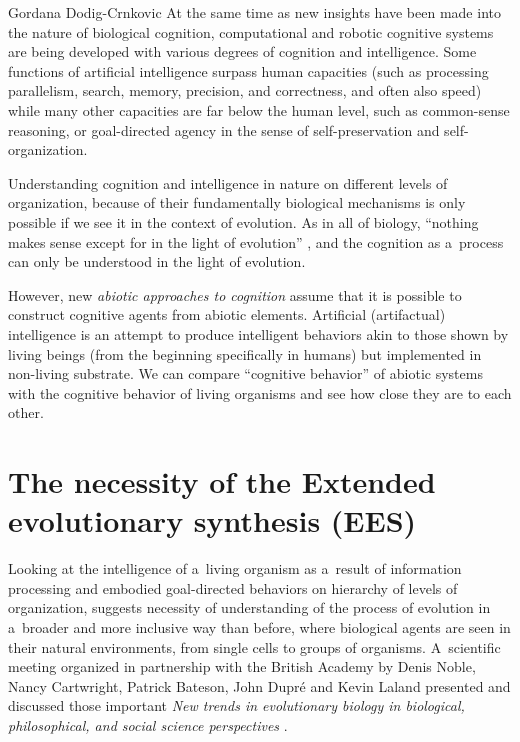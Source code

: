 \begin{artengenv}{Gordana Dodig-Crnkovic}
At the same time as new insights have been made into the nature of biological cognition, computational and robotic cognitive systems are being developed with various degrees of cognition and intelligence. Some functions of artificial intelligence surpass human capacities (such as processing parallelism, search, memory, precision, and correctness, and often also speed) while many other capacities are far below the human level, such as common-sense reasoning, or goal-directed agency in the sense of self-preservation and self-organization.

Understanding cognition and intelligence in nature on different levels of organization, because of their fundamentally biological mechanisms is only possible if we see it in the context of evolution. As in all of biology, ``nothing makes sense except for in the light of evolution''
\parencite[][]{dobzhansky_nothing_1973}, %
 and the cognition as a~process can only be understood in the light of evolution.

However, new \textit{abiotic approaches to cognition} assume that it is possible to construct cognitive agents from abiotic elements. Artificial (artifactual) intelligence is an attempt to produce intelligent behaviors akin to those shown by living beings (from the beginning specifically in humans) but implemented in non-living substrate. We can compare ``cognitive behavior'' of abiotic systems with the cognitive behavior of living organisms and see how close they are to each other.

\section*{The necessity of the Extended evolutionary synthesis (EES)}
Looking at the intelligence of a~living organism as a~result of information processing and embodied goal-directed behaviors on hierarchy of levels of organization, suggests necessity of understanding of the process of evolution in a~broader and more inclusive way than before, where biological agents are seen in their natural environments, from single cells to groups of organisms. A~scientific meeting organized in partnership with the British Academy by Denis Noble, Nancy Cartwright, Patrick Bateson, John Dupré and Kevin Laland presented and discussed those important \textit{New trends in evolutionary biology in biological, philosophical, and social science perspectives}
\parencite{royal_society_new_2016}.


\end{artengenv}
